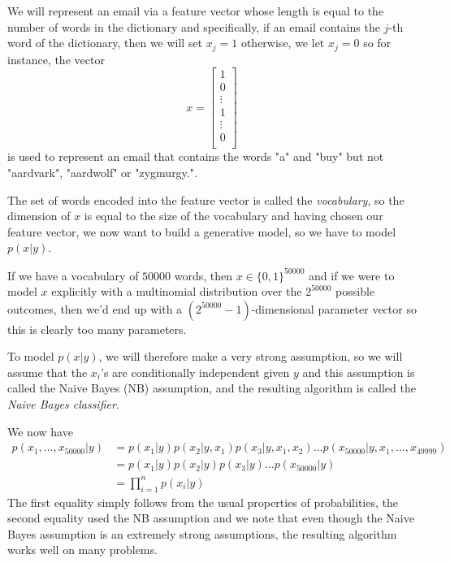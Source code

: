 We will represent an email via a feature vector whose length is equal to the number of words in the dictionary and 
specifically, if an email contains the $j$-th word of the dictionary, then we will set $x_j = 1$ otherwise,
we let $x_j = 0$ so for instance, the vector 
\[ x = \begin{bmatrix}
    1 \\
    0 \\
    \vdots \\
    1 \\
    \vdots \\
    0 \\
       \end{bmatrix} \]
is used to represent an email that contains the words "a" and "buy" but not "aardvark", "aardwolf" 
or "zygmurgy.".

The set of words encoded into the feature vector is called the \emph{vocabulary}, so the dimension of
$x$ is equal to the size of the vocabulary and having chosen our feature vector, 
we now want to build a generative model, so we have to model $p(x | y)$.

If we have a vocabulary of $50000$ words, then $x \in \{0, 1\}^{50000}$ and if we were to model $x$
explicitly with a multinomial distribution over the $2^{50000}$ possible outcomes, then we’d end up 
with a $(2^{50000} - 1)$-dimensional parameter vector so this is clearly too many parameters.

To model $p(x |y)$, we will therefore make a very strong assumption, so we will assume that the $x_i$’s
are conditionally independent given $y$ and this assumption is called the Naive Bayes (NB) assumption,
and the resulting algorithm is called the \emph{Naive Bayes classifier}.

We now have 
\begin{align*}
    p(x_1, \dots, x_{50000} | y) & = p(x_1 | y)p(x_2 | y, x_1)p(x_3 | y, x_1, x_2) \dots 
                                     p(x_{50000} | y, x_1, \dots, x_{49999}) \\
                                 & = p(x_1 | y)p(x_2| y)p(x_3 | y)\dots p(x_{50000} | y) \\
                                 & = \prod _{i=1}^n p(x_i | y) 
\end{align*}
The first equality simply follows from the usual properties of probabilities, the second equality used
the NB assumption and we note that even though the Naive Bayes assumption is an extremely strong assumptions,
the resulting algorithm works well on many problems.

